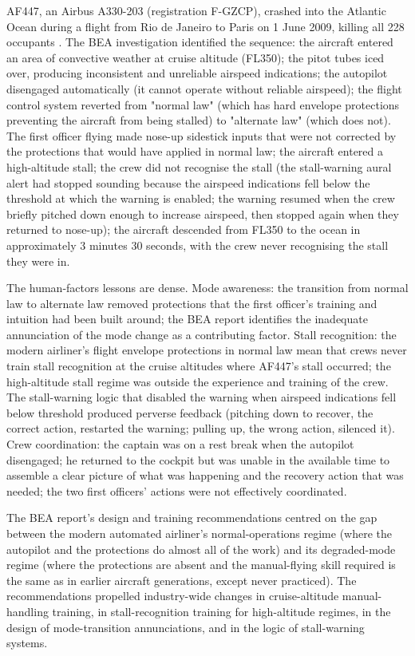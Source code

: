 AF447, an Airbus A330-203 (registration F-GZCP), crashed into the Atlantic Ocean during a flight from Rio de Janeiro to Paris on 1 June 2009, killing all 228 occupants \cite{acc:bea-af447}. The BEA investigation identified the sequence: the aircraft entered an area of convective weather at cruise altitude (FL350); the pitot tubes iced over, producing inconsistent and unreliable airspeed indications; the autopilot disengaged automatically (it cannot operate without reliable airspeed); the flight control system reverted from "normal law" (which has hard envelope protections preventing the aircraft from being stalled) to "alternate law" (which does not). The first officer flying made nose-up sidestick inputs that were not corrected by the protections that would have applied in normal law; the aircraft entered a high-altitude stall; the crew did not recognise the stall (the stall-warning aural alert had stopped sounding because the airspeed indications fell below the threshold at which the warning is enabled; the warning resumed when the crew briefly pitched down enough to increase airspeed, then stopped again when they returned to nose-up); the aircraft descended from FL350 to the ocean in approximately 3 minutes 30 seconds, with the crew never recognising the stall they were in.

The human-factors lessons are dense. Mode awareness: the transition from normal law to alternate law removed protections that the first officer's training and intuition had been built around; the BEA report identifies the inadequate annunciation of the mode change as a contributing factor. Stall recognition: the modern airliner's flight envelope protections in normal law mean that crews never train stall recognition at the cruise altitudes where AF447's stall occurred; the high-altitude stall regime was outside the experience and training of the crew. The stall-warning logic that disabled the warning when airspeed indications fell below threshold produced perverse feedback (pitching down to recover, the correct action, restarted the warning; pulling up, the wrong action, silenced it). Crew coordination: the captain was on a rest break when the autopilot disengaged; he returned to the cockpit but was unable in the available time to assemble a clear picture of what was happening and the recovery action that was needed; the two first officers' actions were not effectively coordinated.

The BEA report's design and training recommendations centred on the gap between the modern automated airliner's normal-operations regime (where the autopilot and the protections do almost all of the work) and its degraded-mode regime (where the protections are absent and the manual-flying skill required is the same as in earlier aircraft generations, except never practiced). The recommendations propelled industry-wide changes in cruise-altitude manual-handling training, in stall-recognition training for high-altitude regimes, in the design of mode-transition annunciations, and in the logic of stall-warning systems.

